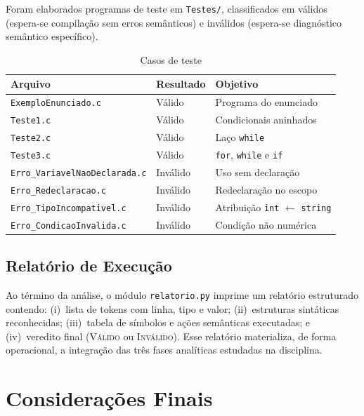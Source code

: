 \documentclass[12pt,a4paper]{article}
\begin{document}
Foram elaborados programas de teste em \texttt{Testes/}, classificados em válidos
(espera-se compilação sem erros semânticos) e inválidos (espera-se diagnóstico
semântico específico).

\begin{table}[h]
  \centering
  \caption{Casos de teste}
  \small
  \begin{tabular}{@{}llp{6.5cm}@{}}
    \toprule
    \textbf{Arquivo} & \textbf{Resultado} & \textbf{Objetivo} \\
    \midrule
    \texttt{ExemploEnunciado.c} & Válido & Programa do enunciado \\
    \texttt{Teste1.c}           & Válido & Condicionais aninhados \\
    \texttt{Teste2.c}           & Válido & Laço \texttt{while} \\
    \texttt{Teste3.c}           & Válido & \texttt{for}, \texttt{while} e \texttt{if} \\
    \texttt{Erro\_VariavelNaoDeclarada.c} & Inválido & Uso sem declaração \\
    \texttt{Erro\_Redeclaracao.c}         & Inválido & Redeclaração no escopo \\
    \texttt{Erro\_TipoIncompativel.c}     & Inválido & Atribuição \texttt{int} $\leftarrow$ \texttt{string} \\
    \texttt{Erro\_CondicaoInvalida.c}     & Inválido & Condição não numérica \\
    \bottomrule
  \end{tabular}
\end{table}

\subsection{Relatório de Execução}

Ao término da análise, o módulo \texttt{relatorio.py} imprime um relatório estruturado
contendo: (i)~lista de tokens com linha, tipo e valor; (ii)~estruturas sintáticas
reconhecidas; (iii)~tabela de símbolos e ações semânticas executadas; e (iv)~veredito
final (\textsc{Válido} ou \textsc{Inválido}). Esse relatório materializa, de forma
operacional, a integração das três fases analíticas estudadas na disciplina.

\section{Considerações Finais}
\end{document}
